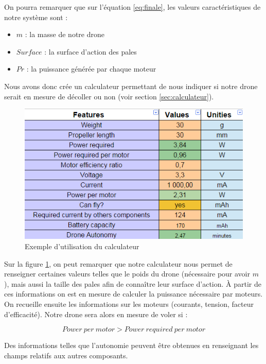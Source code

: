 \documentclass[a4paper,10pt]{report}
\begin{document}
	On pourra remarquer que sur l'équation \ref{eq:finale}, les valeurs 
caractéristiques de notre système sont :
	\begin{itemize}
	  \item $m$ : la masse de notre drone
	  \item $Surface$ : la surface d'action des pales
	  \item $Pr$ : la puissance générée par chaque moteur
	\end{itemize}
	
	Nous avons donc crée un calculateur permettant de nous indiquer si 
notre drone serait en mesure de décoller ou non (voir section 
\ref{sec:calculateur}). 

	  \begin{figure}[htbp]
	    \centering
	    \includegraphics[scale = 0.5]{img/calculateur.png}
	    \caption{Exemple d'utilisation du calculateur}
	    \label{calculateur}
	  \end{figure}

	Sur la figure \ref{calculateur}, on peut remarquer que notre 
calculateur nous permet de renseigner certaines valeurs telles que le poids du 
drone (nécessaire pour avoir $m$), mais aussi la taille des pales afin de 
connaître leur surface d'action. À partir de ces informations on est en mesure 
de calculer la puissance nécessaire par moteurs. On recueille ensuite les 
informations sur les moteurs (courants, tension, facteur d'efficacité). 
Notre drone sera alors en mesure de voler si :

	\begin{equation}
	  Power \ per \ motor > Power \ required \ per \ motor 
	\end{equation}

	Des informations telles que l'autonomie peuvent être obtenues en 
renseignant les champs relatifs aux autres composants.

  \listoffigures
  
  \raggedright
  
  
\end{document}
